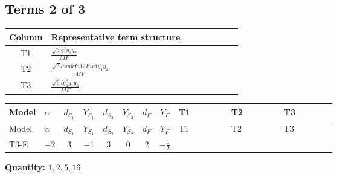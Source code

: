 \documentclass[8pt]{article}
\begin{document}
\begin{landscape}
\subsection*{Terms 2 of 3}
\begin{center}
\begin{tabular}{@{}c >{\raggedright\arraybackslash}p{0.82\linewidth}@{}}
\toprule
Column & Representative term structure \\
\midrule
T1 & \(\displaystyle \frac{\sqrt{3} g_{1}^{2} \overline{y_{1}} \overline{y_{2}}}{MF}\) \\
\midrule
T2 & \(\displaystyle \frac{\sqrt{3} lambda12Inv1 \overline{y_{1}} \overline{y_{2}}}{MF}\) \\
\midrule
T3 & \(\displaystyle \frac{\sqrt{6} i g_{2}^{2} \overline{y_{1}} \overline{y_{2}}}{MF}\) \\
\midrule
\bottomrule
\end{tabular}
\end{center}
\smallskip
\tiny
\begin{longtable}{@{}llcccccc >{\raggedright\arraybackslash}p{0.21\linewidth} >{\raggedright\arraybackslash}p{0.21\linewidth} >{\raggedright\arraybackslash}p{0.21\linewidth}@{}}
\toprule
Model & $\alpha$ & $d_{S_1}$ & $Y_{S_1}$ & $d_{S_2}$ & $Y_{S_2}$ & $d_F$ & $Y_F$ & T1 & T2 & T3 \\
\midrule
\endfirsthead
\toprule
Model & $\alpha$ & $d_{S_1}$ & $Y_{S_1}$ & $d_{S_2}$ & $Y_{S_2}$ & $d_F$ & $Y_F$ & T1 & T2 & T3 \\
\midrule
\endhead
T3-E & $-2$ & $3$ & $-1$ & $3$ & $0$ & $2$ & $-\frac{1}{2}$ & \scriptsize\adjustbox{max width=\linewidth}{$\begin{gathered} - \frac{\sqrt{3} g_{1}^{2} \overline{y_{1}} \overline{y_{2}}}{8 MF}\end{gathered}$} & \scriptsize\adjustbox{max width=\linewidth}{$\begin{gathered} \frac{\sqrt{3} lambda12Inv1 \overline{y_{1}} \overline{y_{2}}}{6 MF}\end{gathered}$} & \scriptsize\adjustbox{max width=\linewidth}{$\begin{gathered} - \frac{\sqrt{6} i g_{2}^{2} \overline{y_{1}} \overline{y_{2}}}{6 MF}\end{gathered}$} \\
\midrule
\bottomrule
\end{longtable}
\clearpage
\noindent\textbf{Quantity: }$\mathrm{1,2,5,16}$\par\smallskip

\end{landscape}
\end{document}
